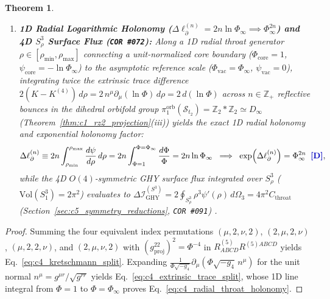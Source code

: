 \documentclass[11pt,a4paper]{article}
\newcommand{\catD}{\text{\textbf{\textcolor{blue!75!black}{[D]}}}}
\theoremstyle{definition}
\theoremstyle{plain}
\newtheorem{theorem}[axiom]{Theorem}
\theoremstyle{remark}
\begin{document}
\begin{theorem}
\begin{enumerate}[label=(\roman*)]
\begin{align}
  \mathcal{I}_5 + \mathcal{I}_{\mathrm{GHY}} &= \int_{\mathcal{M}_4} d^4x\sqrt{-g_4}\,\Phi\,R^{(4)} + 2\oint_{\partial\mathcal{M}_4} d^3\Sigma\sqrt{|h_3|}\,\Phi\,K^{(4)} \qquad (\epsilon_n = +1) \;\;\catD, \label{eq:c4_ghy_cancellation}
  \end{align}
  cancelling the boundary divergence $-2\oint d^3\Sigma\sqrt{|h_3|}\,n^\mu\partial_\mu\Phi$ of Eq.~\eqref{eq:c3_i5_4d_split} identically.
  \item \textbf{1D Radial Logarithmic Holonomy ($\Delta\ell_\partial^{(n)} = 2n\ln\Phi_\infty \implies \Phi_\infty^{2n}$) and 4D $S^3_\rho$ Surface Flux (\texttt{COR~\#072}):}
  Along a 1D radial throat generator $\rho \in [\rho_{\min}, \rho_{\max}]$ connecting a unit-normalized core boundary ($\Phi_{\mathrm{core}} = 1$, $\psi_{\mathrm{core}} = -\ln\Phi_\infty$) to the asymptotic reference scale ($\Phi_{\mathrm{vac}} = \Phi_\infty$, $\psi_{\mathrm{vac}} = 0$), integrating twice the extrinsic trace difference $2(K - K^{(4)})\,d\rho = 2\,n^\mu\partial_\mu(\ln\Phi)\,d\rho = 2\,d(\ln\Phi)$ across $n \in \mathbb{Z}_+$ reflective bounces in the dihedral orbifold group $\pi_1^{\mathrm{orb}}(\mathcal{S}_{t_2}) = \mathbb{Z}_2 * \mathbb{Z}_2 \simeq D_\infty$ (Theorem~\ref{thm:c1_rz2_projection}(iii)) yields the exact 1D radial holonomy and exponential holonomy factor:
  \begin{equation}\label{eq:c4_radial_throat_holonomy}
  \Delta\ell_\partial^{(n)} \equiv 2n\int_{\rho_{\min}}^{\rho_{\max}}\frac{d\psi}{d\rho}\,d\rho = 2n\int_{\Phi=1}^{\Phi=\Phi_\infty}\frac{d\Phi}{\Phi} = 2n\ln\Phi_\infty \;\;\Longrightarrow\;\; \exp\!\left(\Delta\ell_\partial^{(n)}\right) = \Phi_\infty^{2n} \;\;\catD,
  \end{equation}
  while the 4D $O(4)$-symmetric GHY surface flux integrated over $S^3_\rho$ ($\mathrm{Vol}(S^3_1) = 2\pi^2$) evaluates to $\Delta\mathcal{I}_{\mathrm{GHY}}^{(S^3)} = 2\oint_{S^3_\rho}\rho^3\psi'(\rho)\,d\Omega_3 = 4\pi^2 C_{\mathrm{throat}}$ (Section~\ref{sec:c5_symmetry_reductions}, \texttt{COR~\#091}) \catD.
\end{enumerate}
\end{theorem}

\begin{proof}
Summing the four equivalent index permutations $(\mu, 2, \nu, 2)$, $(2, \mu, 2, \nu)$, $(\mu, 2, 2, \nu)$, and $(2, \mu, \nu, 2)$ with $(g_{\mathrm{proj}}^{22})^2 = \Phi^{-4}$ in $R^{(5)}_{ABCD}R^{(5)ABCD}$ yields Eq.~\eqref{eq:c4_kretschmann_split}. Expanding $\frac{1}{\Phi\sqrt{-g_4}}\partial_\mu(\Phi\sqrt{-g_4}\,n^\mu)$ for the unit normal $n^\mu = g^{\mu r}/\sqrt{g^{rr}}$ yields Eq.~\eqref{eq:c4_extrinsic_trace_split}, whose 1D line integral from $\Phi = 1$ to $\Phi = \Phi_\infty$ proves Eq.~\eqref{eq:c4_radial_throat_holonomy}.
\end{proof}
\end{document}
